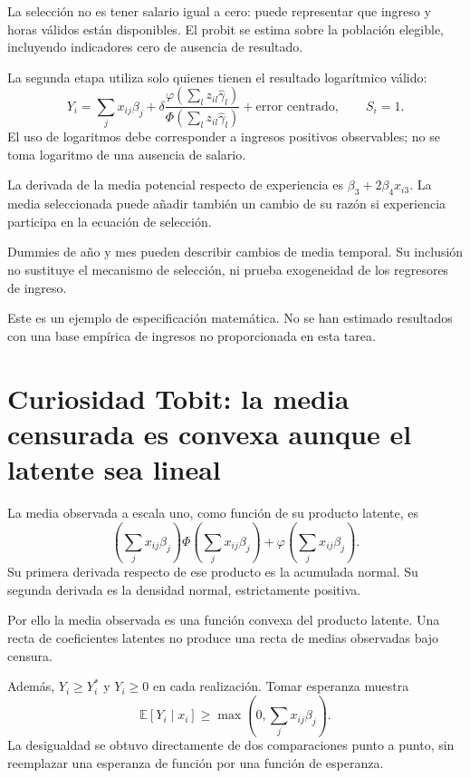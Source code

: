 \documentclass[11pt,a4paper]{article}
\newcommand{\E}{\mathbb E}
\begin{document}
La selección no es
tener salario igual a cero:
puede representar que
ingreso y horas válidos
están disponibles.
El probit se estima
sobre la población elegible,
incluyendo indicadores cero
de ausencia de resultado.

La segunda etapa utiliza
solo quienes tienen
el resultado logarítmico válido:
\[
Y_i=\sum_jx_{ij}\beta_j+
\delta\frac{\varphi(\sum_lz_{il}\widehat\gamma_l)}
{\Phi(\sum_lz_{il}\widehat\gamma_l)}
+\text{error centrado},\qquad S_i=1.
\]
El uso de logaritmos
debe corresponder a
ingresos positivos observables;
no se toma logaritmo
de una ausencia de salario.

\begin{ejemplo}
La derivada de la
media potencial respecto
de experiencia es
\(\beta_3+2\beta_4x_{i3}\).
La media seleccionada
puede añadir también
un cambio de su razón
si experiencia participa
en la ecuación de selección.
\end{ejemplo}
Dummies de año y mes
pueden describir cambios
de media temporal.
Su inclusión no sustituye
el mecanismo de selección,
ni prueba exogeneidad
de los regresores de ingreso.

Este es un ejemplo
de especificación matemática.
No se han estimado
resultados con una base
empírica de ingresos
no proporcionada en esta tarea.

\clearpage
\section{Curiosidad Tobit: la media censurada es convexa aunque el latente sea lineal}\label{unidad174}
La media observada a escala uno,
como función de su producto latente,
es
\[
\left(\sum_jx_{ij}\beta_j\right)
\Phi\left(\sum_jx_{ij}\beta_j\right)
+\varphi\left(\sum_jx_{ij}\beta_j\right).
\]
Su primera derivada respecto
de ese producto es
la acumulada normal.
Su segunda derivada es
la densidad normal,
estrictamente positiva.

Por ello la media observada
es una función convexa
del producto latente.
Una recta de coeficientes
latentes no produce una
recta de medias observadas
bajo censura.

Además, \(Y_i\ge Y_i^\ast\)
y \(Y_i\ge0\) en
cada realización.
Tomar esperanza muestra
\[
\E[Y_i\mid x_i]\ge
\max\left(0,\sum_jx_{ij}\beta_j\right).
\]
La desigualdad se obtuvo
directamente de dos
comparaciones punto a punto,
sin reemplazar una
esperanza de función
por una función de esperanza.
\end{document}
